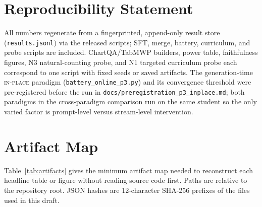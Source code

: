 \documentclass[11pt]{article}
\newcommand{\inplace}{\textsc{in-place}}
\begin{document}
\section*{Reproducibility Statement}
\label{sec:repro}
All numbers regenerate from a fingerprinted, append-only result store (\texttt{results.jsonl}) via the released scripts; SFT, merge, battery, curriculum, and probe scripts are included. ChartQA/TabMWP builders, power table, faithfulness figures, N3 natural-counting probe, and N1 targeted curriculum probe each correspond to one script with fixed seeds or saved artifacts. The generation-time \inplace{} paradigm (\texttt{battery\_online\_p3.py}) and its convergence threshold were pre-registered before the run in \texttt{docs/preregistration\_p3\_inplace.md}; both paradigms in the cross-paradigm comparison run on the same student so the only varied factor is prompt-level versus stream-level intervention.

\appendix

\section{Artifact Map}
\label{app:artifacts}

Table~\ref{tab:artifacts} gives the minimum artifact map needed to reconstruct each headline table or figure without reading source code first. Paths are relative to the repository root. JSON hashes are 12-character SHA-256 prefixes of the files used in this draft.
\end{document}
